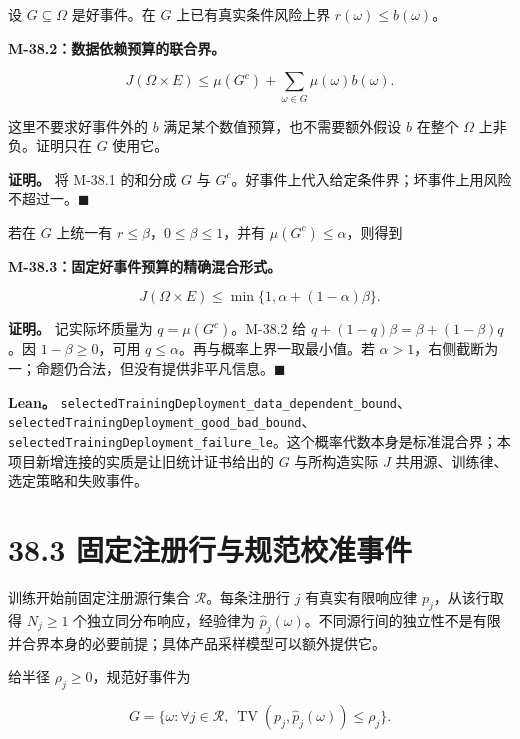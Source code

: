 \documentclass[
  11pt,
  oneside]{book}
\begin{document}
设 \(G\subseteq\Omega\) 是好事件。在 \(G\) 上已有真实条件风险上界 \(r(\omega)\le b(\omega)\)。

\hypertarget{m-38-2}{}\label{m-38-2}

\textbf{M-38.2：数据依赖预算的联合界。}

\[J(\Omega\times E)
\le
\mu(G^c)+\sum_{\omega\in G}\mu(\omega)b(\omega).\]

这里不要求好事件外的 \(b\) 满足某个数值预算，也不需要额外假设 \(b\) 在整个 \(\Omega\) 上非负。证明只在 \(G\) 使用它。

\textbf{证明。} 将 M-38.1 的和分成 \(G\) 与 \(G^c\)。好事件上代入给定条件界；坏事件上用风险不超过一。\(\blacksquare\)

若在 \(G\) 上统一有 \(r\le\beta\)，\(0\le\beta\le1\)，并有 \(\mu(G^c)\le\alpha\)，则得到

\hypertarget{m-38-3}{}\label{m-38-3}

\textbf{M-38.3：固定好事件预算的精确混合形式。}

\[J(\Omega\times E)
\le\min\{1,\alpha+(1-\alpha)\beta\}.\]

\textbf{证明。} 记实际坏质量为 \(q=\mu(G^c)\)。M-38.2 给 \(q+(1-q)\beta=\beta+(1-\beta)q\)。因 \(1-\beta\ge0\)，可用 \(q\le\alpha\)。再与概率上界一取最小值。若 \(\alpha>1\)，右侧截断为一；命题仍合法，但没有提供非平凡信息。\(\blacksquare\)

\textbf{Lean。} \nolinkurl{selectedTrainingDeployment_data_dependent_bound}、\nolinkurl{selectedTrainingDeployment_good_bad_bound}、\nolinkurl{selectedTrainingDeployment_failure_le}。这个概率代数本身是标准混合界；本项目新增连接的实质是让旧统计证书给出的 \(G\) 与所构造实际 \(J\) 共用源、训练律、选定策略和失败事件。

\section{38.3 固定注册行与规范校准事件}\label{ux56faux5b9aux6ce8ux518cux884cux4e0eux89c4ux8303ux6821ux51c6ux4e8bux4ef6}

训练开始前固定注册源行集合 \(\mathcal R\)。每条注册行 \(j\) 有真实有限响应律 \(p_j\)，从该行取得 \(N_j\ge1\) 个独立同分布响应，经验律为 \(\widehat p_j(\omega)\)。不同源行间的独立性不是有限并合界本身的必要前提；具体产品采样模型可以额外提供它。

给半径 \(\rho_j\ge0\)，规范好事件为

\[G=\{\omega:\forall j\in\mathcal R,\
\operatorname{TV}(p_j,\widehat p_j(\omega))\le\rho_j\}.\]
\end{document}
